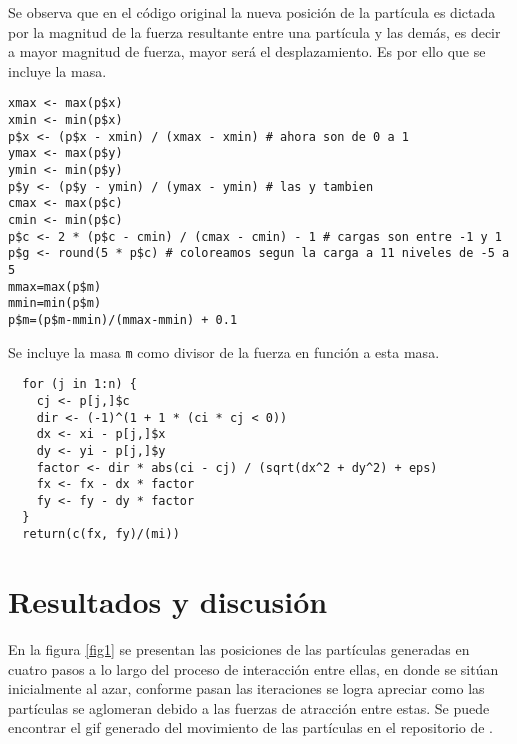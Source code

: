\documentclass[12pt]{amsart}
\begin{document}
Se observa que en el código original la nueva posición de la partícula es dictada por la magnitud de la fuerza resultante entre una partícula y las demás, es decir a mayor magnitud de fuerza, mayor será el desplazamiento. Es por ello que se incluye la masa.
\renewcommand{\listingscaption}{Código}
\begin{listing}[H]
  \begin{verbatim}
xmax <- max(p$x)
xmin <- min(p$x)
p$x <- (p$x - xmin) / (xmax - xmin) # ahora son de 0 a 1
ymax <- max(p$y)
ymin <- min(p$y)
p$y <- (p$y - ymin) / (ymax - ymin) # las y tambien
cmax <- max(p$c)
cmin <- min(p$c)
p$c <- 2 * (p$c - cmin) / (cmax - cmin) - 1 # cargas son entre -1 y 1
p$g <- round(5 * p$c) # coloreamos segun la carga a 11 niveles de -5 a 5
mmax=max(p$m)
mmin=min(p$m)
p$m=(p$m-mmin)/(mmax-mmin) + 0.1
  \end{verbatim}
  \label{codigo1}
\end{listing}
\clearpage
Se incluye la masa \texttt{m} como divisor de la fuerza en función a esta masa.
\renewcommand{\listingscaption}{Código}
\begin{listing}[H]
  \begin{verbatim}
  for (j in 1:n) {
    cj <- p[j,]$c
    dir <- (-1)^(1 + 1 * (ci * cj < 0))
    dx <- xi - p[j,]$x
    dy <- yi - p[j,]$y
    factor <- dir * abs(ci - cj) / (sqrt(dx^2 + dy^2) + eps)
    fx <- fx - dx * factor
    fy <- fy - dy * factor
  }
  return(c(fx, fy)/(mi))
  \end{verbatim}
  \label{codigo1}
\end{listing}

\section{Resultados y discusión}
En la figura \ref{fig1} se presentan las posiciones de las partículas generadas en cuatro pasos a lo largo del proceso de interacción entre ellas, en donde se sitúan inicialmente al azar, conforme pasan las iteraciones se logra apreciar como las partículas se aglomeran debido a las fuerzas de atracción entre estas. Se puede encontrar el gif generado del movimiento de las partículas en el repositorio de \cite{mtyor}.
\end{document}
